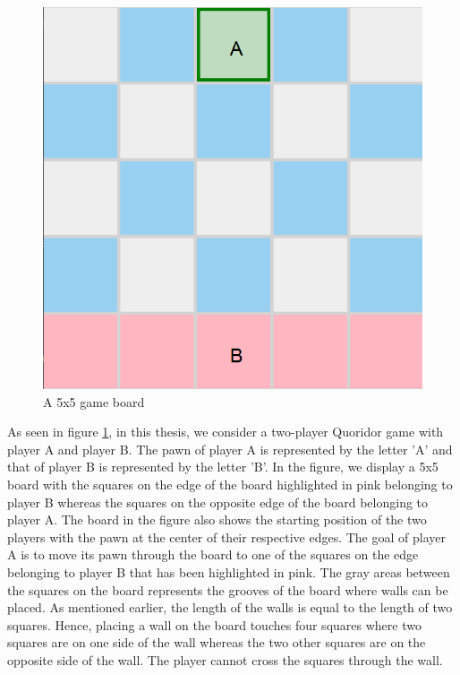 \begin{figure}[h]
    \centering
    \includegraphics[scale=0.25]{../img/GameBoard/initial.png}
    \caption{A 5x5 game board}
    \label{fig:InitialGameBoard}
\end{figure}

As seen in figure \ref{fig:InitialGameBoard}, in this thesis, we consider a two-player Quoridor game with player A and player B. The pawn of player A is represented by the letter 'A' and that of player B is represented by the letter 'B'. In the figure, we display a 5x5 board with the squares on the edge of the board highlighted in pink belonging to player B whereas the squares on the opposite edge of the board belonging to player A. The board in the figure also shows the starting position of the two players with the pawn at the center of their respective edges. The goal of player A is to move its pawn through the board to one of the squares on the edge belonging to player B that has been highlighted in pink. The gray areas between the squares on the board represents the grooves of the board where walls can be placed. As mentioned earlier, the length of the walls is equal to the length of two squares. Hence, placing a wall on the board touches four squares where two squares are on one side of the wall whereas the two other squares are on the opposite side of the wall. The player cannot cross the squares through the wall. 

